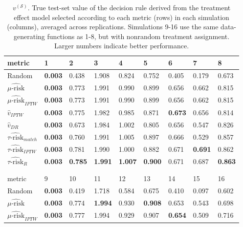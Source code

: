 \begin{table}[ht]
\end{table}

\begin{table}[ht]
\centering
\caption{$v^{(\mathcal{S})}$. True test-set value of the decision rule derived from the treatment effect model selected according to each metric (rows) in each simulation (columns), averaged across replications. Simulations 9-16 use the same data-generating functions as 1-8, but with nonrandom treatment assignment. Larger numbers indicate better performance.}
\begin{tabular}{lllllllll}
  \hline
metric & 1 & 2 & 3 & 4 & 5 & 6 & 7 & 8 \\ 
  \hline
Random & \bfseries{0.003} & 0.438 & 1.908 & 0.824 & 0.752 & 0.405 & 0.179 & 0.673 \\ 
  $\widehat{\mu\text{-risk}}$ & \bfseries{0.003} & 0.773 & 1.991 & 0.990 & 0.899 & 0.656 & 0.662 & 0.815 \\ 
  $\widehat{\mu\text{-risk}}_{IPTW}$ & \bfseries{0.003} & 0.773 & 1.991 & 0.990 & 0.899 & 0.656 & 0.662 & 0.815 \\ 
  $\hat v_{IPTW}$ & \bfseries{0.003} & 0.775 & 1.982 & 0.985 & 0.871 & \bfseries{0.673} & 0.656 & 0.814 \\ 
  $\hat v_{DR}$ & \bfseries{0.003} & 0.673 & 1.984 & 1.002 & 0.805 & 0.656 & 0.547 & 0.826 \\ 
  $\widehat{\tau\text{-risk}}_{match}$ & \bfseries{0.003} & 0.760 & 1.991 & 1.005 & 0.897 & 0.666 & 0.529 & 0.857 \\ 
  $\widehat{\tau\text{-risk}}_{IPTW}$ & \bfseries{0.003} & 0.781 & 1.990 & 1.000 & 0.882 & 0.671 & \bfseries{0.691} & 0.862 \\ 
  $\widehat{\tau\text{-risk}}_{R}$ & \bfseries{0.003} & \bfseries{0.785} & \bfseries{1.991} & \bfseries{1.007} & \bfseries{0.900} & 0.671 & 0.687 & \bfseries{0.863} \\ 
  \hline
   \\
  \\
  \hline
metric & 9 & 10 & 11 & 12 & 13 & 14 & 15 & 16 \\ 
  \hline
Random & \bfseries{0.003} & 0.419 & 1.718 & 0.584 & 0.675 & 0.410 & 0.097 & 0.602 \\ 
  $\widehat{\mu\text{-risk}}$ & \bfseries{0.003} & 0.774 & \bfseries{1.994} & 0.930 & \bfseries{0.908} & 0.653 & 0.543 & 0.698 \\ 
  $\widehat{\mu\text{-risk}}_{IPTW}$ & \bfseries{0.003} & 0.777 & 1.994 & 0.929 & 0.907 & \bfseries{0.654} & 0.509 & 0.716 \\ 

\end{tabular}
\end{table}
